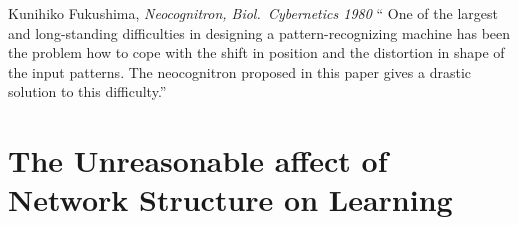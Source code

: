 \documentclass[thesis]{subfiles}
\begin{document}
	\begin{chapquote}{Kunihiko Fukushima, \textit{Neocognitron, 
				Biol.\ Cybernetics 1980}}
	`` One of the largest and long-standing difficulties in designing a pattern-recognizing machine has been the problem how to cope with the shift in position and the distortion in shape of the input patterns. The neocognitron proposed in this paper gives a drastic solution to this difficulty.''
	\end{chapquote}
	
	\section{The Unreasonable affect of Network Structure on Learning}
	
\end{document}
